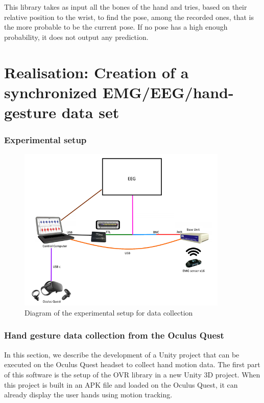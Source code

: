 \documentclass{article}
\begin{document}
This library takes as input all the bones of the hand and tries, based on their relative position to the wrist, to find the pose, among the recorded ones, that is the more probable to be the current pose. If no pose has a high enough probability, it does not output any prediction.



\part{Realisation: Creation of a synchronized EMG/EEG/hand-gesture data set}


\section{Experimental setup}

\begin{figure}[H]
    \centering
    \includegraphics[width=10cm]{images/experimentalSetup.png}
    \caption{Diagram of the experimental setup for data collection}
    \label{fig:experimentalSetup}
\end{figure}


\section{Hand gesture data collection from the Oculus Quest}

In this section, we describe the development of a Unity project that can be executed on the Oculus Quest headset to collect hand motion data. The first part of this software is the setup of the OVR library in a new Unity 3D project. When this project is built in an APK file and loaded on the Oculus Quest, it can already display the user hands using motion tracking.
\end{document}
